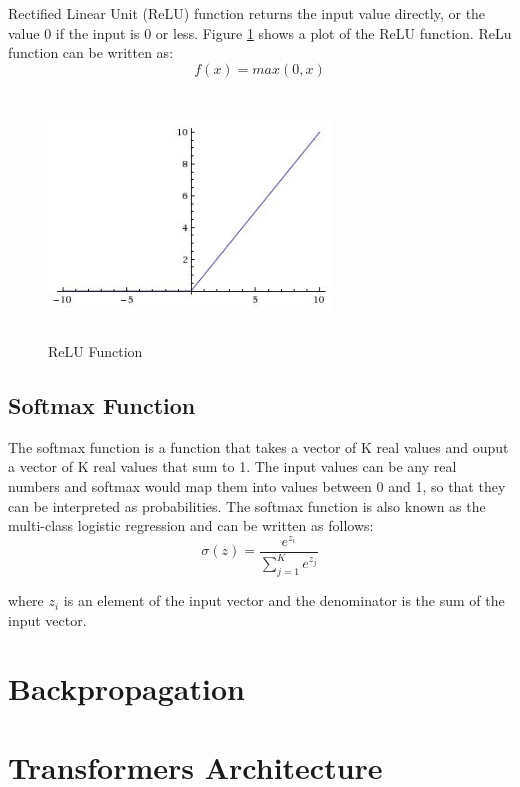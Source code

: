 Rectified Linear Unit (ReLU) function returns the input value directly, or the value 0 if the input is 0 or less. Figure \ref{fig:relu} shows a plot of the ReLU function. ReLu function can be written as:
\begin{equation}
    f(x) = max(0,x)
\end{equation}

\begin{figure}[ht]
\includegraphics[width=7.5cm, height=6.5cm]{images/relu.jpeg}
\centering
\caption{ReLU Function}
\label{fig:relu}
\end{figure}
\FloatBarrier

\subsection{Softmax Function}

The softmax function is a function that takes a vector of K real values and ouput a vector of K real values that sum to 1. The input values can be any real numbers and softmax would map them into values between 0 and 1, so that they can be interpreted as probabilities. The softmax function is also known as the multi-class logistic regression and can be written as follows:
\begin{equation}
    \sigma(z) = \frac{e^{z_i}}{\sum_{j=1}^K e^{z_j}}
\end{equation}

where $z_i$ is an element of the input vector and the denominator is the sum of the input vector.

\section{Backpropagation}

\section{Transformers Architecture}
